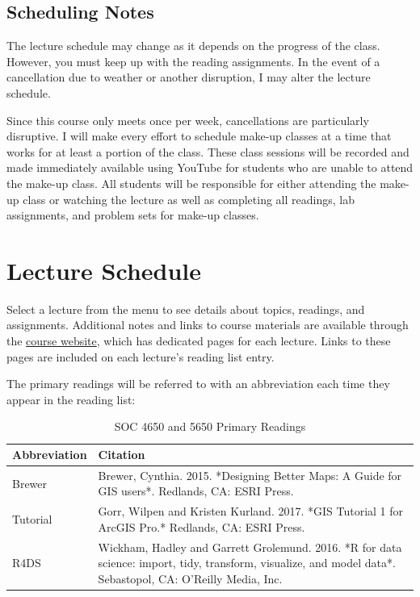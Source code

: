 \documentclass[]{book}
\begin{document}
\hypertarget{scheduling-notes}{%
\section{Scheduling Notes}\label{scheduling-notes}}

The lecture schedule may change as it depends on the progress of the class. However, you must keep up with the reading assignments. In the event of a cancellation due to weather or another disruption, I may alter the lecture schedule.

Since this course only meets once per week, cancellations are particularly disruptive. I will make every effort to schedule make-up classes at a time that works for at least a portion of the class. These class sessions will be recorded and made immediately available using YouTube for students who are unable to attend the make-up class. All students will be responsible for either attending the make-up class or watching the lecture as well as completing all readings, lab assignments, and problem sets for make-up classes.

\hypertarget{lecture-schedule}{%
\chapter{Lecture Schedule}\label{lecture-schedule}}

Select a lecture from the menu to see details about topics, readings, and assignments. Additional notes and links to course materials are available through the \href{https://slu-soc5050.github.io}{course website}, which has dedicated pages for each lecture. Links to these pages are included on each lecture's reading list entry.

The primary readings will be referred to with an abbreviation each time they appear in the reading list:

\begin{table}

\caption{\label{tab:unnamed-chunk-1}SOC 4650 and 5650 Primary Readings}
\centering
\begin{tabular}[t]{ll}
\toprule
Abbreviation & Citation\\
\midrule
Brewer & Brewer, Cynthia. 2015. *Designing Better Maps: A Guide for GIS users*. Redlands, CA: ESRI Press.\\
Tutorial & Gorr, Wilpen and Kristen Kurland. 2017. *GIS Tutorial 1 for ArcGIS Pro.* Redlands, CA: ESRI Press.\\
R4DS & Wickham, Hadley and Garrett Grolemund. 2016. *R for data science: import, tidy, transform, visualize, and model data*. Sebastopol, CA: O'Reilly Media, Inc.\\
\bottomrule
\end{tabular}
\end{table}
\end{document}
